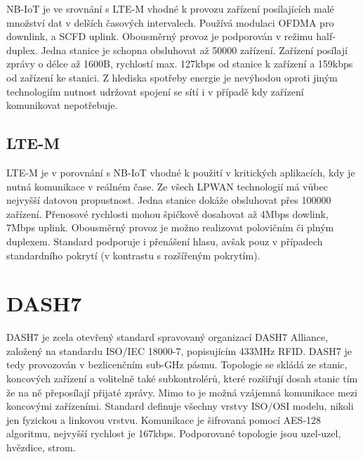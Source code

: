 NB-IoT je ve srovnání s LTE-M vhodné k provozu zařízení posílajících malé 
množství dat v delších časových intervalech. Používá modulaci OFDMA pro 
downlink, a SCFD uplink. Obousměrný provoz je podporován v režimu half-duplex. 
Jedna stanice je schopna obsluhovat až 50000 zařízení. Zařízení posílají zprávy 
o délce až 1600B, rychlostí max. 127kbps od stanice k zařízení a 159kbps od 
zařízení ke stanici. Z hlediska spotřeby energie je nevýhodou oproti jiným
technologiím nutnost udržovat spojení se sítí i v případě kdy zařízení 
komunikovat nepotřebuje.

\subsection{LTE-M}

LTE-M je v porovnání s NB-IoT vhodné k použití v kritických aplikacích, kdy je 
nutná komunikace v reálném čase. Ze všech LPWAN technologií má vůbec nejvyšší 
datovou propustnost. Jedna stanice dokáže obsluhovat přes 100000 zařízení. 
Přenosové rychlosti mohou špičkově dosahovat až 4Mbps dowlink, 7Mbps uplink. 
Obousměrný provoz je možno realizovat polovičním či plným duplexem. Standard 
podporuje i přenášení hlasu, avšak pouz v případech standardního pokrytí
(v kontrastu s rozšířeným pokrytím).


\section{DASH7}

DASH7 je zcela otevřený standard spravovaný organizací DASH7 Alliance, založený 
na standardu ISO/IEC 18000-7, popisujícím 433MHz RFID. DASH7 je tedy provozován 
v bezlicenčním sub-GHz pásmu. Topologie se skládá ze stanic, koncových zařízení 
a volitelně také subkontrolérů, které rozšiřují dosah stanic tím že na ně 
přeposílají přijaté zprávy. Mimo to je možná vzájemná komunikace mezi koncovými
zařízeními. Standard definuje všechny vrstvy ISO/OSI modelu, nikoli jen fyzickou 
a linkovou vrstvu. Komunikace je šifrovaná pomocí AES-128 algoritmu, nejvyšší 
rychlost je 167kbps. Podporované topologie jsou uzel-uzel, hvězdice, strom.